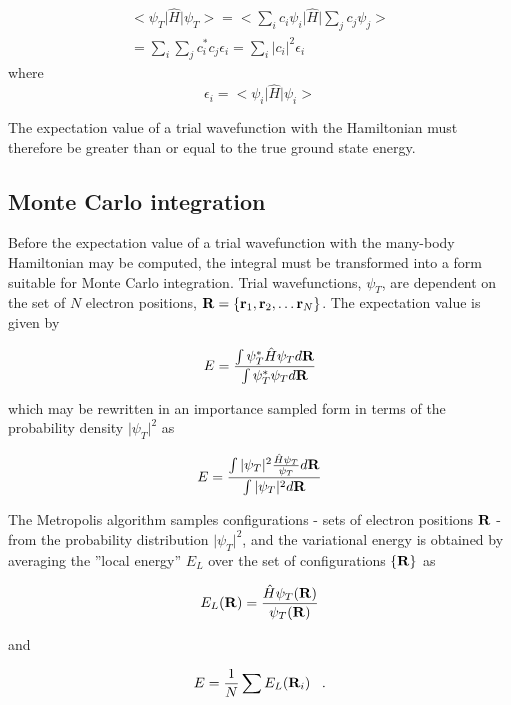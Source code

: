 \documentclass{article}
\begin{document}
\begin{align}
 <\psi_T\vert\hat{H}\vert\psi_T >  = <\sum_i c_i\psi_i\vert\hat{H}\vert\sum_j c_j\psi_j > \\
 = \sum_i \sum_j c_{i}^{*} c_{j} \epsilon_{i} = \sum_i \vert c_{i}\vert^{2} \epsilon_{i}
\end{align}
where 
\begin{equation}
 \epsilon_{i} = <\psi_i\vert\hat{H}\vert\psi_i >
\end{equation}

The expectation value of a trial wavefunction with the Hamiltonian must therefore be greater than or equal to the true ground state energy.

\subsection{Monte Carlo integration}
Before the expectation value of a trial wavefunction with the many-body Hamiltonian may be computed, the integral must be transformed into a form suitable for Monte Carlo integration. Trial wavefunctions, $\psi_T$, are dependent on the set of $N$ electron positions,  ${\bf R}=\{{\bf r}_1,{\bf r}_2, \ldots {\bf r}_N\}$. The expectation value is given by

\begin{equation}
E=\frac{\int \psi_{T}^{*}\hat{H}\psi_{T} d{\bf R}}
{\int \psi_{T}^{*}\psi_{T}d{\bf R}}
\end{equation}

which may be rewritten in an importance sampled form in terms of the probability density  $\vert\psi_{T}\vert^{2}$ as

\begin{equation}
E=\frac{\int \vert\psi_{T}\vert^{2}\frac{\hat{H}\psi_{T}}{\psi_{T}} d{\bf R}}
{\int \vert\psi_{T}\vert^{2}d{\bf R}}
\end{equation}

The Metropolis algorithm samples configurations - sets of electron positions ${\bf R}$ - from the probability distribution  $\vert\psi_{T}\vert^{2}$, and the variational energy is obtained by averaging the ''local energy'' $E_{L}$ over the set of configurations $\{{\bf R}\}$ as 

\begin{equation}
\label{E_local}
E_{L}({\bf R})=\frac{\hat{H}\psi_{T}({\bf R})}{\psi_{T}({\bf R})}
\end{equation}

and 

\begin{equation}
E=\frac{1}{N} \sum E_{L}({\bf R}_i) \;\;\;.
\end{equation}
\end{document}
